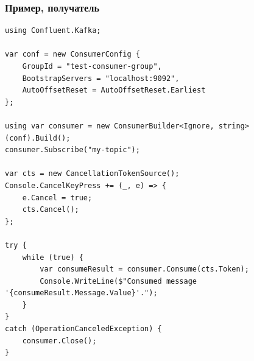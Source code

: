 \documentclass{../../slides-style}
\begin{document}
    \begin{frame}[fragile]
        \frametitle{Пример, получатель}
        \begin{ssmall}
            \begin{verbatim}
using Confluent.Kafka;

var conf = new ConsumerConfig {
    GroupId = "test-consumer-group",
    BootstrapServers = "localhost:9092",
    AutoOffsetReset = AutoOffsetReset.Earliest
};

using var consumer = new ConsumerBuilder<Ignore, string>(conf).Build();
consumer.Subscribe("my-topic");

var cts = new CancellationTokenSource();
Console.CancelKeyPress += (_, e) => {
    e.Cancel = true;
    cts.Cancel();
};

try {
    while (true) {
        var consumeResult = consumer.Consume(cts.Token);
        Console.WriteLine($"Consumed message '{consumeResult.Message.Value}'.");
    }
}
catch (OperationCanceledException) {
    consumer.Close();
}
            \end{verbatim}
        \end{ssmall}
    \end{frame}
\end{document}
